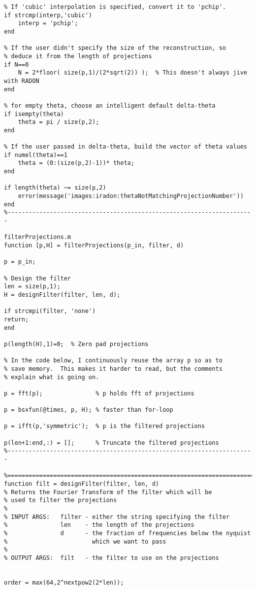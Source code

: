 \begin{lstlisting}
% If 'cubic' interpolation is specified, convert it to 'pchip'. 
if strcmp(interp,'cubic')
    interp = 'pchip';
end

% If the user didn't specify the size of the reconstruction, so
% deduce it from the length of projections
if N==0
    N = 2*floor( size(p,1)/(2*sqrt(2)) );  % This doesn't always jive with RADON
end

% for empty theta, choose an intelligent default delta-theta
if isempty(theta)
    theta = pi / size(p,2);
end

% If the user passed in delta-theta, build the vector of theta values
if numel(theta)==1
    theta = (0:(size(p,2)-1))* theta;
end

if length(theta) ~= size(p,2)
    error(message('images:iradon:thetaNotMatchingProjectionNumber'))
end
%----------------------------------------------------------------------

filterProjections.m
function [p,H] = filterProjections(p_in, filter, d)

p = p_in;

% Design the filter
len = size(p,1);
H = designFilter(filter, len, d);

if strcmpi(filter, 'none')
return;
end

p(length(H),1)=0;  % Zero pad projections

% In the code below, I continuously reuse the array p so as to
% save memory.  This makes it harder to read, but the comments
% explain what is going on.

p = fft(p);               % p holds fft of projections

p = bsxfun(@times, p, H); % faster than for-loop

p = ifft(p,'symmetric');  % p is the filtered projections

p(len+1:end,:) = [];      % Truncate the filtered projections
%----------------------------------------------------------------------

%======================================================================
function filt = designFilter(filter, len, d)
% Returns the Fourier Transform of the filter which will be
% used to filter the projections
%
% INPUT ARGS:   filter - either the string specifying the filter
%               len    - the length of the projections
%               d      - the fraction of frequencies below the nyquist
%                        which we want to pass
%
% OUTPUT ARGS:  filt   - the filter to use on the projections


order = max(64,2^nextpow2(2*len));


\end{lstlisting}
